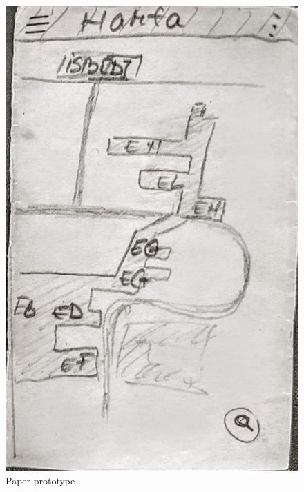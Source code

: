 \begin{figure}[ht]
         \includegraphics[height=0.279\textheight]{figures/app/paper/map.jpg}
    \caption{Paper prototype}
    \label{4:fig:paper_prototyping}
\end{figure}

\clearpage

